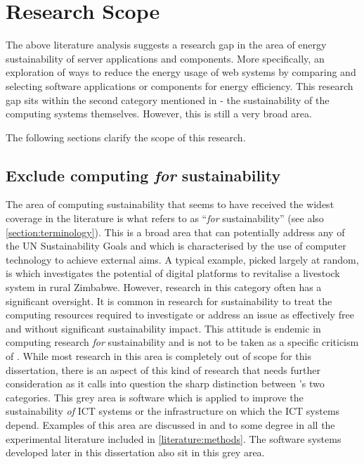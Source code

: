 \section{Research Scope}
\label{literature:gap}

The above literature analysis suggests a research gap in the area of energy sustainability of server applications and components. More specifically, an exploration of ways to reduce the energy usage of web systems by comparing and selecting software applications or components for energy efficiency. This research gap sits within the second category mentioned in \citet{Penzenstadler2013} - the sustainability of the computing systems themselves. However, this is still a very broad area.

The following sections clarify the scope of this research.

\subsection{Exclude computing \emph{for} sustainability}
\label{exclude:for sustainability}

The area of computing sustainability that seems to have received the widest coverage in the literature is what \citet{Penzenstadler2013} refers to as \enquote{\emph{for} sustainability} (see also \autoref{section:terminology}). This is a broad area that can potentially address any of the UN Sustainability Goals and which is characterised by the use of computer technology to achieve external aims. A typical example, picked largely at random, is \citet{Gwaka2022} which investigates the potential of digital platforms to revitalise a livestock system in rural Zimbabwe. However, research in this category often has a significant oversight. It is common in research for sustainability to treat the computing resources required to investigate or address an issue as effectively free and without significant sustainability impact. This attitude is endemic in computing research \emph{for} sustainability and is not to be taken as a specific criticism of \citeauthor{Gwaka2022}. While most research in this area is completely out of scope for this dissertation, there is an aspect of this kind of research that needs further consideration as it calls into question the sharp distinction between \citeauthor{Penzenstadler2013}'s two categories. This grey area is software which is applied to improve the sustainability \emph{of} \gls{ICT} systems or the infrastructure on which the \gls{ICT} systems depend. Examples of this area are discussed in \citet{Verdecchia2022a} and to some degree in all the experimental literature included in \autoref{literature:methods}. The software systems developed later in this dissertation also sit in this grey area.

